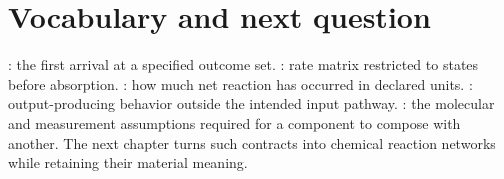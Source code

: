 \section{Vocabulary and next question}
: the first arrival at a specified outcome set.
: rate matrix restricted to states before absorption.
: how much net reaction has occurred in declared units.
: output-producing behavior outside the intended input pathway.
: the molecular and measurement assumptions required
for a component to compose with another. The next chapter turns such contracts
into chemical reaction networks while retaining their material meaning.
